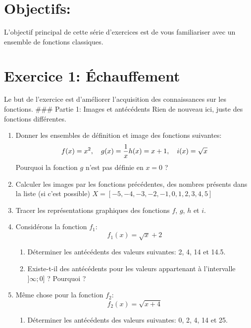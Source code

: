 \documentclass[11pt, french]{article}
\begin{document}
\section*{Objectifs:}
L'objectif principal de cette série d'exercices est de vous familiariser avec un ensemble de fonctions classiques.

\section*{Exercice 1: Échauffement}
Le but de l'exercice est d'améliorer l'acquisition des connaissances sur les fonctions.
### Partie 1: Images et antécédents
Rien de nouveau ici, juste des fonctions différentes.

\begin{enumerate}

    \item Donner les ensembles de définition et image des fonctions suivantes:
    \begin{equation*}
        f(x) = x^2, \quad g(x) = \frac{1}{x} \\
        h(x) = x + 1, \quad i(x)=\sqrt{x}
    \end{equation*}
    Pourquoi la fonction $g$ n'est pas définie en $x=0$ ?
    \item Calculer les images par les fonctions précédentes, des nombres présents dans la liste (si c'est possible) $X = [-5, -4, -3, -2, -1, 0, 1, 2, 3, 4, 5]$
    \item Tracer les représentations graphiques des fonctions $f$, $g$, $h$ et $i$.
    \item Considérons la fonction $f_1$:
    \begin{equation*}
        f_1(x) = \sqrt{x}+2
    \end{equation*}
    \begin{enumerate}
       \item Déterminer les antécédents des valeurs suivantes: 2, 4, 14 et 14.5.
       \item Existe-t-il des antécédents pour les valeurs appartenant à l'intervalle $]\infty ; 0]$ ? Pourquoi ?
    \end{enumerate}
    \item Même chose pour la fonction $f_2$:
    \begin{equation*}
        f_2(x) = \sqrt{x+4} 
    \end{equation*}
    \begin{enumerate}
       \item Déterminer les antécédents des valeurs suivantes: 0, 2, 4, 14 et 25.

\end{enumerate}
\end{enumerate}
\end{document}
